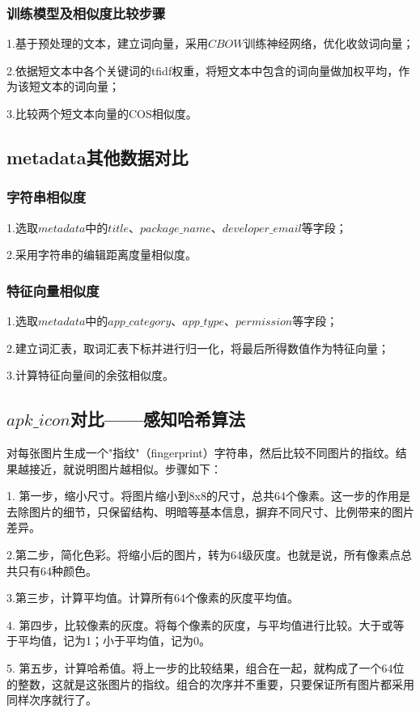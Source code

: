 \documentclass[UTF8,a4paper,10pt, twocolumn]{ctexart}
\begin{document}

\subsubsection{训练模型及相似度比较步骤}
1.基于预处理的文本，建立词向量，采用$CBOW$训练神经网络，优化收敛词向量；

2.依据短文本中各个关键词的tfidf权重，将短文本中包含的词向量做加权平均，作为该短文本的词向量；

3.比较两个短文本向量的COS相似度。

\subsection{metadata其他数据对比}
\subsubsection{字符串相似度}
1.选取$metadata$中的$title$、$package\_name$、$developer\_email$等字段；

2.采用字符串的编辑距离度量相似度。

\subsubsection{特征向量相似度}
1.选取$metadata$中的$app\_category$、$app\_type$、$permission$等字段；

2.建立词汇表，取词汇表下标并进行归一化，将最后所得数值作为特征向量；

3.计算特征向量间的余弦相似度。

\subsection{$apk\_icon$对比——感知哈希算法}
对每张图片生成一个"指纹"（fingerprint）字符串，然后比较不同图片的指纹。结果越接近，就说明图片越相似。步骤如下：

1. 第一步，缩小尺寸。将图片缩小到8x8的尺寸，总共64个像素。这一步的作用是去除图片的细节，只保留结构、明暗等基本信息，摒弃不同尺寸、比例带来的图片差异。

2.第二步，简化色彩。将缩小后的图片，转为64级灰度。也就是说，所有像素点总共只有64种颜色。

3.第三步，计算平均值。计算所有64个像素的灰度平均值。

4. 第四步，比较像素的灰度。将每个像素的灰度，与平均值进行比较。大于或等于平均值，记为1；小于平均值，记为0。

5. 第五步，计算哈希值。将上一步的比较结果，组合在一起，就构成了一个64位的整数，这就是这张图片的指纹。组合的次序并不重要，只要保证所有图片都采用同样次序就行了。
\end{document}
